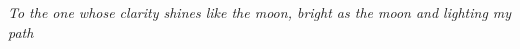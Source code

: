  \newpage

  \thispagestyle{empty} \mbox{}

  \vfill

  \begin{center}
    \textit{
      To the one whose clarity shines like the moon, bright as the moon and lighting my path
    }
  \end{center} \vspace*{5cm}

  \vfill 